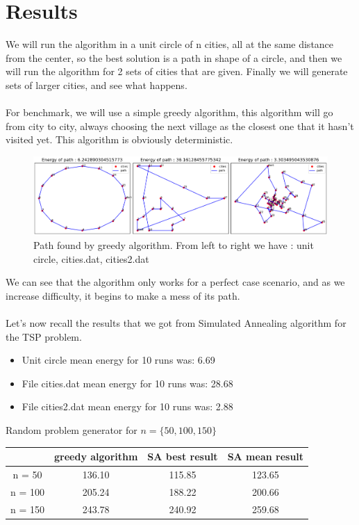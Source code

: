 \documentclass[a4paper]{article}
\begin{document}
\newpage
\section{Results}
We will run the algorithm in a unit circle of n cities, all at the same distance from the center, so the best solution is a path in shape of a circle, and then we will run the algorithm for 2 sets of cities that are given. Finally we will generate sets of larger cities, and see what happens.\\\\
For benchmark, we will use a simple greedy algorithm, this algorithm will go from city to city, always choosing the next village as the closest one that it hasn't visited yet. This algorithm is obviously deterministic. 
\begin{figure}[H]
\center
\includegraphics[width=1\textwidth]{images/algorithm_greedy.PNG}
\caption{Path found by greedy algorithm. From left to right we have : unit circle, cities.dat, cities2.dat}
\end{figure}
We can see that the algorithm only works for a perfect case scenario, and as we increase difficulty, it begins to make a mess of its path.\\\\
Let's now recall the results that we got from Simulated Annealing algorithm for the TSP problem.\\
\begin{itemize}
\item[] Unit circle mean energy for 10 runs was: 6.69
\item[] File cities.dat mean energy for 10 runs was: 28.68
\item[] File cities2.dat mean energy for 10 runs was: 2.88
\end{itemize}
\begin{center}

Random problem generator for $n = \{50, 100, 150\}$\\
\begin{tabular}{|c|c|c|c|}
\hline
        &  greedy algorithm &  SA best result &  SA mean result \\ \hline
 n = 50  &  136.10           &  115.85        &  123.65        \\ \hline
 n = 100 &  205.24           &  188.22    &  200.66         \\ \hline
 n = 150 &  243.78          &     240.92           &  259.68         \\ \hline
\end{tabular}
\end{center}
\end{document}
